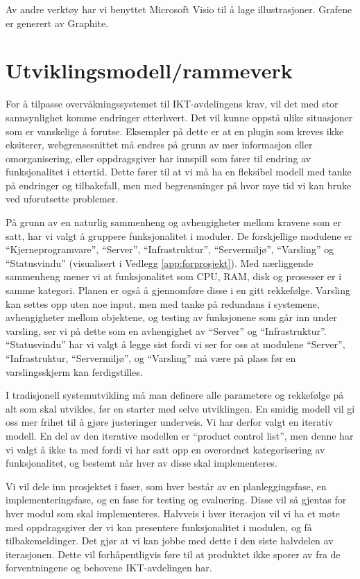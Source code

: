 Av andre verktøy har vi benyttet Microsoft Visio til å lage illustrasjoner. Grafene er generert av Graphite.

\section{Utviklingsmodell/rammeverk}
For å tilpasse overvåkningssystemet til IKT-avdelingens krav, vil det med stor sannsynlighet komme endringer etterhvert. Det vil kunne oppstå ulike situasjoner som er vanskelige å forutse. Eksempler på dette er at en plugin som kreves ikke eksiterer, webgrensesnittet må endres på grunn av mer informasjon eller omorganisering, eller oppdragsgiver har innspill som fører til endring av funksjonalitet i ettertid. Dette fører til at vi må ha en fleksibel modell med tanke på endringer og tilbakefall, men med begrensninger på hvor mye tid vi kan bruke ved uforutsette problemer.

På grunn av en naturlig sammenheng og avhengigheter mellom kravene som er satt, har vi valgt å gruppere funksjonalitet i moduler. De forskjellige modulene er “Kjerneprogramvare”, “Server”, “Infrastruktur”, “Servermiljø”, “Varsling” og “Statusvindu” (visualisert i Vedlegg \ref{app:forprosjekt}). Med nærliggende sammenheng mener vi at funksjonalitet som CPU, RAM, disk og prosesser er i samme kategori. Planen er også å gjennomføre disse i en gitt rekkefølge. Varsling kan settes opp uten noe input, men med tanke på redundans i systemene, avhengigheter mellom objektene, og testing av funksjonene som går inn under varsling, ser vi på dette som en avhengighet av “Server” og “Infrastruktur”. “Statusvindu” har vi valgt å legge sist fordi vi ser for oss at modulene “Server”, “Infrastruktur, “Servermiljø”, og “Varsling” må være på plass før en varslingsskjerm kan ferdigstilles.

I tradisjonell systemutvikling må man definere alle parametere og rekkefølge på alt som skal utvikles, før en starter med selve utviklingen. En smidig modell vil gi oss mer frihet til å gjøre justeringer underveis. Vi har derfor valgt en iterativ modell\cite{wiki:iterativ}. En del av den iterative modellen er “product control list”, men denne har vi valgt å ikke ta med fordi vi har satt opp en overordnet kategorisering av funksjonalitet, og bestemt når hver av disse skal implementeres.

Vi vil dele inn prosjektet i faser, som hver består av en planleggingsfase, en implementeringsfase, og en fase for testing og evaluering. Disse vil så gjentas for hver modul som skal implementeres. Halvveis i hver iterasjon vil vi ha et møte med oppdragsgiver der vi kan presentere funksjonalitet i modulen, og få tilbakemeldinger. Det gjør at vi kan jobbe med dette i den siste halvdelen av iterasjonen. Dette vil forhåpentligvis føre til at produktet ikke sporer av fra de forventningene og behovene IKT-avdelingen har.


